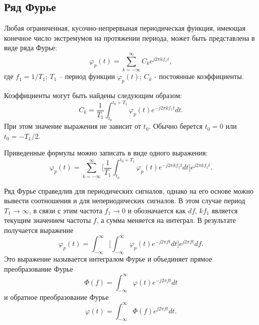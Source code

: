\documentclass[a4paper,14pt]{extarticle}
\begin{document}
\subsection{Ряд Фурье}

Любая ограниченная, кусочно-непрервыная периодическая функция, имеющая конечное число экстремумов на протяжении периода, может быть представлена в виде ряда Фурье: 
\begin{equation*}
\varphi_p (t) = \sum_{k = -\infty}^{\infty} C_k e^{j 2 \pi k f_1 t} ,
\label{f1}
\end{equation*}
где $f_1 = 1 / T_1$; $T_1$ -- период функции $\varphi_p (t)$; $C_k$ - постоянные коэффициенты.

Коэффициенты могут быть найдены следующим образом:
\begin{equation*}
C_k = \frac{1}{T_1} \int_{t_0}^{t_0 + T_1} \varphi_p (t) e^{-j 2 \pi k f_1 t} dt.
\label{f2}
\end{equation*}
При этом значение выражения не зависит от $t_0$. Обычно берется $t_0 = 0$ или $t_0 = - T_1 / 2$.

Приведенные формулы можно записать в виде одного выражения:  
\begin{equation*}
\varphi_p (t) = \sum_{k = -\infty}^{\infty} \bigg[ \frac{1}{T_1} \int_{t_0}^{t_0 + T_1} \varphi_p (t) e^{-j 2 \pi k f_1 t} dt \bigg] e^{j 2 \pi k f_1 t}.
\label{f3}
\end{equation*}

Ряд Фурье справедлив для периодических сигналов, однако на его основе можно вывести соотношения и для непериодических сигналов. В этом случае период $T_1 \rightarrow \infty$, в связи с этим частота $f_1 \rightarrow 0$ и обозначается как $df$, $k f_1$ является текущим значением частоты $f$, а сумма меняется на интеграл. В результате получается выражение 
\begin{equation*}
\varphi_p (t) = \int_{-\infty}^{\infty} \bigg[ \int_{-\infty}^{\infty} \varphi_p (t) e^{-j 2 \pi f t} dt \bigg] e^{j 2 \pi f t} df.
\label{f4}
\end{equation*}
Это выражение называется интегралом Фурье и объединяет прямое преобразование Фурье
\begin{equation*}
\Phi (f) = \int_{-\infty}^{\infty} \varphi (t) e^{-j 2 \pi f t} dt
\end{equation*}
и обратное преобразование Фурье
\begin{equation*}
\varphi (t) = \int_{-\infty}^{\infty} \Phi (f) e^{j 2 \pi f t} dt.
\end{equation*}
\end{document}
